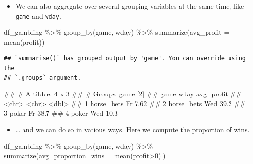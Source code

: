 \documentclass[
]{book}
\newenvironment{Shaded}{\begin{snugshade}}{\end{snugshade}}
\newcommand{\AttributeTok}[1]{\textcolor[rgb]{0.77,0.63,0.00}{#1}}
\newcommand{\DecValTok}[1]{\textcolor[rgb]{0.00,0.00,0.81}{#1}}
\newcommand{\FunctionTok}[1]{\textcolor[rgb]{0.00,0.00,0.00}{#1}}
\newcommand{\NormalTok}[1]{#1}
\newcommand{\SpecialCharTok}[1]{\textcolor[rgb]{0.00,0.00,0.00}{#1}}
\providecommand{\tightlist}{%
  \setlength{\itemsep}{0pt}\setlength{\parskip}{0pt}}
\begin{document}
\begin{itemize}
\tightlist
\item
  We can also aggregate over several grouping variables at the same time, like \texttt{game} and \texttt{wday}.
\end{itemize}

\begin{Shaded}
\begin{Highlighting}[]
\NormalTok{df\_gambling }\SpecialCharTok{\%\textgreater{}\%} 
  \FunctionTok{group\_by}\NormalTok{(game, wday) }\SpecialCharTok{\%\textgreater{}\%} 
  \FunctionTok{summarize}\NormalTok{(}\AttributeTok{avg\_profit =} \FunctionTok{mean}\NormalTok{(profit))}
\end{Highlighting}
\end{Shaded}

\begin{verbatim}
## `summarise()` has grouped output by 'game'. You can override using the
## `.groups` argument.
\end{verbatim}

\begin{Shaded}
\begin{Highlighting}[]
\NormalTok{\#\# \# A tibble: 4 x 3}
\NormalTok{\#\# \# Groups:   game [2]}
\NormalTok{\#\#   game       wday  avg\_profit}
\NormalTok{\#\#   \textless{}chr\textgreater{}      \textless{}chr\textgreater{}      \textless{}dbl\textgreater{}}
\NormalTok{\#\# 1 horse\_bets Fr          7.62}
\NormalTok{\#\# 2 horse\_bets Wed        39.2 }
\NormalTok{\#\# 3 poker      Fr         38.7 }
\NormalTok{\#\# 4 poker      Wed        10.3}
\end{Highlighting}
\end{Shaded}

\begin{itemize}
\tightlist
\item
  \ldots{} and we can do so in various ways. Here we compute the proportion of wins.
\end{itemize}

\begin{Shaded}
\begin{Highlighting}[]
\NormalTok{df\_gambling }\SpecialCharTok{\%\textgreater{}\%} 
  \FunctionTok{group\_by}\NormalTok{(game, wday) }\SpecialCharTok{\%\textgreater{}\%} 
  \FunctionTok{summarize}\NormalTok{(}\AttributeTok{avg\_proportion\_wins =} \FunctionTok{mean}\NormalTok{(profit}\SpecialCharTok{\textgreater{}}\DecValTok{0}\NormalTok{) )}
\end{Highlighting}
\end{Shaded}
\end{document}
